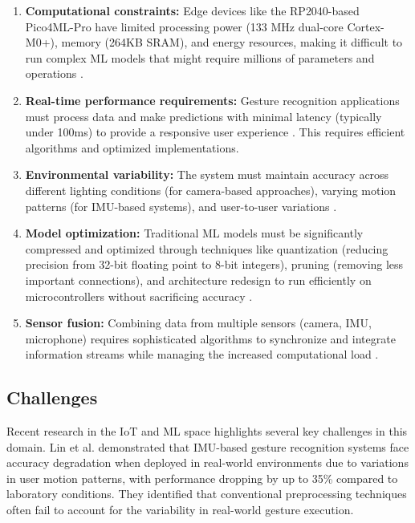 \begin{enumerate}
	\item \textbf{Computational constraints:} Edge devices like the RP2040-based Pico4ML-Pro have limited processing power (133 MHz dual-core Cortex-M0+), memory (264KB SRAM), and energy resources, making it difficult to run complex ML models that might require millions of parameters and operations \cite{Arducam:2023}.
	
	\item \textbf{Real-time performance requirements:} Gesture recognition applications must process data and make predictions with minimal latency (typically under 100ms) to provide a responsive user experience \cite{Lin:2023}. This requires efficient algorithms and optimized implementations.
	
	\item \textbf{Environmental variability:} The system must maintain accuracy across different lighting conditions (for camera-based approaches), varying motion patterns (for IMU-based systems), and user-to-user variations \cite{Fan:2023}.
	
	\item \textbf{Model optimization:} Traditional ML models must be significantly compressed and optimized through techniques like quantization (reducing precision from 32-bit floating point to 8-bit integers), pruning (removing less important connections), and architecture redesign to run efficiently on microcontrollers without sacrificing accuracy \cite{Banbury:2020}.
	
	\item \textbf{Sensor fusion:} Combining data from multiple sensors (camera, IMU, microphone) requires sophisticated algorithms to synchronize and integrate information streams while managing the increased computational load \cite{Kumar:2022}.\\
	
\end{enumerate}



\subsection{Challenges}

Recent research in the IoT  and ML  space highlights several key challenges in this domain. Lin et al. \cite{Lin:2023} demonstrated that IMU-based gesture recognition systems face accuracy degradation when deployed in real-world environments due to variations in user motion patterns, with performance dropping by up to 35\% compared to laboratory conditions. They identified that conventional preprocessing techniques often fail to account for the variability in real-world gesture execution.\\

